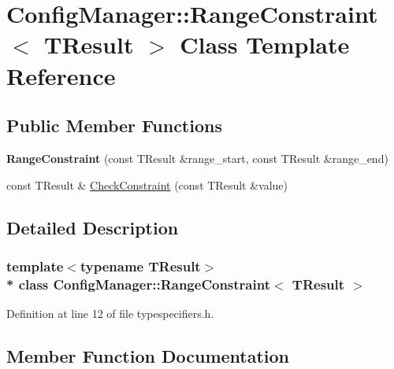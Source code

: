 \hypertarget{class_config_manager_1_1_range_constraint}{}\section{Config\+Manager\+:\+:Range\+Constraint$<$ T\+Result $>$ Class Template Reference}
\label{class_config_manager_1_1_range_constraint}
\subsection*{Public Member Functions}
\begin{DoxyCompactItemize}
\item 
{\bfseries Range\+Constraint} (const T\+Result \&range\+\_\+start, const T\+Result \&range\+\_\+end)\hypertarget{class_config_manager_1_1_range_constraint_a2a7a521c7b79ba43f6051592dc2bc61e}{}\label{class_config_manager_1_1_range_constraint_a2a7a521c7b79ba43f6051592dc2bc61e}

\item 
const T\+Result \& \hyperlink{class_config_manager_1_1_range_constraint_a71057f62a4735e80f1f1faacd7504069}{Check\+Constraint} (const T\+Result \&value)
\end{DoxyCompactItemize}


\subsection{Detailed Description}
\subsubsection*{template$<$typename T\+Result$>$\\*
class Config\+Manager\+::\+Range\+Constraint$<$ T\+Result $>$}



Definition at line 12 of file typespecifiers.\+h.



\subsection{Member Function Documentation}
